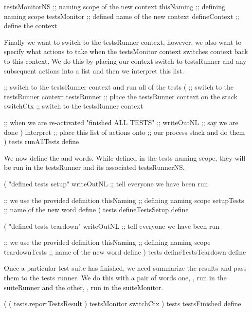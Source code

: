   testsMonitorNS  ;; naming scope of the new context
  thisNaming      ;; defining naming scope
  testsMonitor    ;; defined name of the new context
  defineContext   ;; define the context
\stopJoylolCode

Finally we want to switch to the testsRunner context, however, we also 
want to specify what actions to take when the testsMonitor context 
switches context back to this context. We do this by placing our context 
switch to testsRunner and any subsequent actions into a list and then we 
interpret this list. 

\startJoylolCode
  ;; switch to the testsRunner context and run all of the tests
  (
    ;; switch to the testsRunner context
    testsRunner ;; place the testsRunner context on the stack
    switchCtx   ;; switch to the testsRunner context
    
    ;; when we are re-activated
    "finished ALL TESTS"  ;;
    writeOutNL            ;; say we are done
  )
  interpret     ;; place this list of actions onto
                ;; our process stack and do them
)
tests
runAllTests
define
\stopJoylolCode

We now define the  and  
words. While defined in the tests naming scope, they will be run in the 
testsRunner and its associated testsRunnerNS. 

\startJoylolCode
(
  "defined tests setup"
  writeOutNL  ;; tell everyone we have been run
  
              ;; we use the provided definition
  thisNaming  ;; defining naming scope
  setupTests  ;; name of the new word
  define
)
tests
defineTestsSetup
define
\stopJoylolCode

\startJoylolCode
(
  "defined tests teardown"
  writeOutNL    ;; tell everyone we have been run
  
                ;; we use the provided definition
  thisNaming    ;; defining naming scope
  teardownTests ;; name of the new word
  define
)
tests
defineTestsTeardown
define
\stopJoylolCode

Once a particular test suite has finished, we need summarize the results 
and pass them to the tests runner. We do this with a pair of words one, 
, run in the suiteRunner and the other, 
, run in the suiteMonitor. 

\startJoylolCode
(
  ( tests.reportTestsResult )
  testsMonitor
  switchCtx
)
tests
testsFinished
define
\stopJoylolCode

